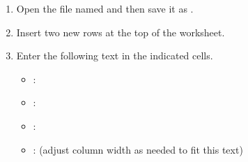 \begin{enumerate}
	\item Open the file named  and then save it as .
	\item Insert two new rows at the top of the worksheet.
	\item Enter the following text in the indicated cells.

\begin{itemize}
	\item {}: 
	\item {}: 
	\item {}: 
	\item {}:  (adjust column width as needed to fit this text)
\end{itemize}


\end{enumerate}
